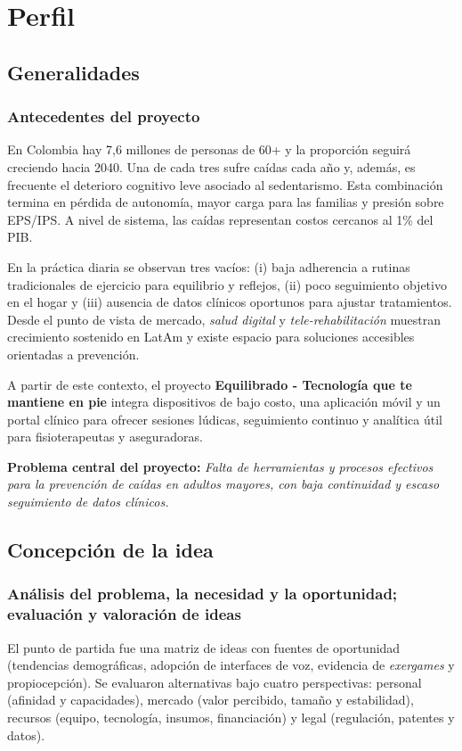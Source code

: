 \section{Perfil}

\subsection{Generalidades}

\subsubsection{Antecedentes del proyecto}
En Colombia hay 7,6 millones de personas de 60+ y la proporción seguirá creciendo hacia 2040. Una de cada tres sufre caídas cada año y, además, es frecuente el deterioro cognitivo leve asociado al sedentarismo. Esta combinación termina en pérdida de autonomía, mayor carga para las familias y presión sobre EPS/IPS. A nivel de sistema, las caídas representan costos cercanos al 1\% del PIB. 

En la práctica diaria se observan tres vacíos: (i) baja adherencia a rutinas tradicionales de ejercicio para equilibrio y reflejos, (ii) poco seguimiento objetivo en el hogar y (iii) ausencia de datos clínicos oportunos para ajustar tratamientos. Desde el punto de vista de mercado, \emph{salud digital} y \emph{tele-rehabilitación} muestran crecimiento sostenido en LatAm y existe espacio para soluciones accesibles orientadas a prevención.

A partir de este contexto, el proyecto \textbf{Equilibrado - Tecnología que te mantiene en pie} integra dispositivos de bajo costo, una aplicación móvil y un portal clínico para ofrecer sesiones lúdicas, seguimiento continuo y analítica útil para fisioterapeutas y aseguradoras. 

\textbf{Problema central del proyecto:} \emph{Falta de herramientas y procesos efectivos para la prevención de caídas en adultos mayores, con baja continuidad y escaso seguimiento de datos clínicos.}

\subsection{Concepción de la idea}

\subsubsection{Análisis del problema, la necesidad y la oportunidad; evaluación y valoración de ideas}
El punto de partida fue una matriz de ideas con fuentes de oportunidad (tendencias demográficas, adopción de interfaces de voz, evidencia de \textit{exergames} y propiocepción). Se evaluaron alternativas bajo cuatro perspectivas: personal (afinidad y capacidades), mercado (valor percibido, tamaño y estabilidad), recursos (equipo, tecnología, insumos, financiación) y legal (regulación, patentes y datos). 

